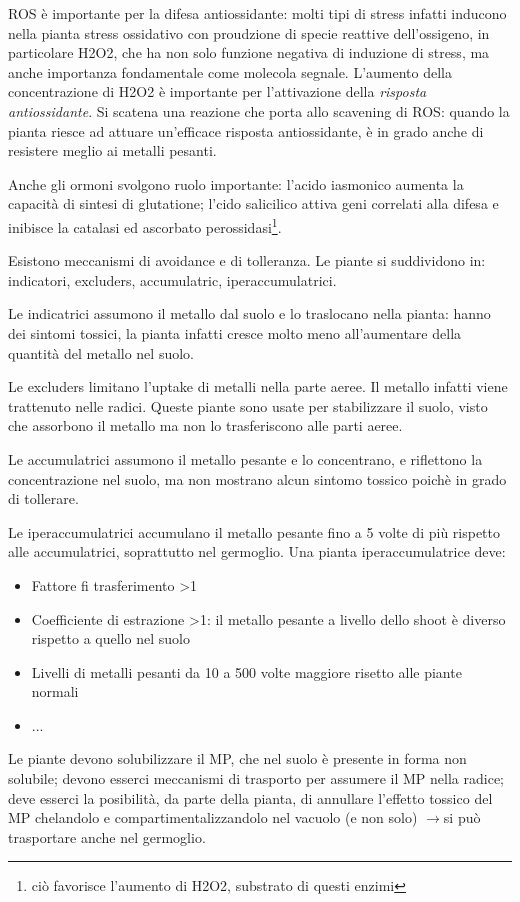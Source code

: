 \documentclass[a4paper,12pt]{book}
\newcommand{\lfreccia}{\ensuremath{\longrightarrow}}
\begin{document}
ROS è importante per la difesa antiossidante: molti tipi di stress infatti inducono nella pianta stress ossidativo con proudzione di specie reattive dell'ossigeno, in particolare H2O2, che ha non solo funzione negativa di induzione di stress, ma anche importanza fondamentale come molecola segnale. L'aumento della concentrazione di H2O2 è importante per l'attivazione della \emph{risposta antiossidante}. Si scatena una reazione che porta allo scavening di ROS: quando la pianta riesce ad attuare un'efficace risposta antiossidante, è in grado anche di resistere meglio ai metalli pesanti.

Anche gli ormoni svolgono ruolo importante: l'acido iasmonico aumenta la capacità di sintesi di glutatione; l'cido salicilico attiva geni correlati alla difesa e inibisce la catalasi ed ascorbato perossidasi\footnote{ciò favorisce l'aumento di H2O2, substrato di questi enzimi}.

Esistono meccanismi di avoidance e di tolleranza. Le piante si suddividono in: indicatori, excluders, accumulatric, iperaccumulatrici.

Le indicatrici assumono il metallo dal suolo e lo traslocano nella pianta: hanno dei sintomi tossici, la pianta infatti cresce molto meno all'aumentare della quantità del metallo nel suolo.

Le excluders limitano l'uptake di metalli nella parte aeree. Il metallo infatti viene trattenuto nelle radici. Queste piante sono usate per stabilizzare il suolo, visto che assorbono il metallo ma non lo trasferiscono alle parti aeree.

Le accumulatrici assumono il metallo pesante e lo concentrano, e riflettono la concentrazione nel suolo, ma non mostrano alcun sintomo tossico poichè in grado di tollerare.

Le iperaccumulatrici accumulano il metallo pesante fino a 5 volte di più rispetto alle accumulatrici, soprattutto nel germoglio. Una pianta iperaccumulatrice deve:
\begin{itemize}
\item{Fattore fi trasferimento >1}
\item{Coefficiente di estrazione >1: il metallo pesante a livello dello shoot è diverso rispetto a quello nel suolo}
\item{Livelli di metalli pesanti da 10 a 500 volte maggiore risetto alle piante normali}
\item{...}
\end{itemize}

Le piante devono solubilizzare il MP, che nel suolo è presente in forma non solubile; devono esserci meccanismi di trasporto per assumere il MP nella radice; deve esserci la posibilità, da parte della pianta, di annullare l'effetto tossico del MP chelandolo e compartimentalizzandolo nel vacuolo (e non solo) \lfreccia si può trasportare anche nel germoglio.
\end{document}
